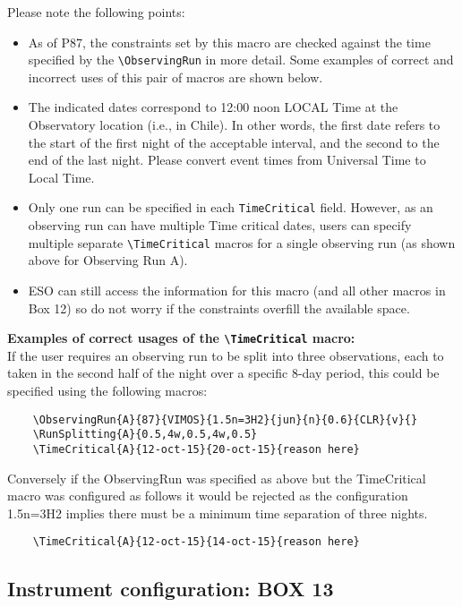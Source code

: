 \documentclass{article}
\begin{document}
Please note the following points:
\begin{itemize}
\item As of P87, the constraints set by this macro are checked against the
time specified by the \verb|\ObservingRun| in more detail.
Some examples of correct and incorrect uses of this pair of macros are shown below.
\item The indicated dates correspond to 12:00 noon LOCAL Time at
the Observatory location (i.e., in Chile). In other words, the first
date refers to the start of the first night of the acceptable
interval, and the second to the end of the last night. Please 
convert event times from Universal Time to Local Time.
\item Only one run can be specified in each \verb|TimeCritical| field. 
However, as an observing run can have multiple Time critical dates, users
can specify multiple separate \verb|\TimeCritical| macros for a single observing run (as shown above
for Observing Run A).
\item ESO can still access the information for this macro (and all other macros in Box 12) so
do not worry if the constraints overfill the available space.
\end{itemize}

{\bf Examples of correct usages of the \verb|\TimeCritical| macro: }\\
If the user requires an observing run to be split into three observations, each to taken in the 
second half of the night over a specific 8-day period, this could be specified using the following macros:
\begin{verbatim}
    \ObservingRun{A}{87}{VIMOS}{1.5n=3H2}{jun}{n}{0.6}{CLR}{v}{}
    \RunSplitting{A}{0.5,4w,0.5,4w,0.5}
    \TimeCritical{A}{12-oct-15}{20-oct-15}{reason here}
\end{verbatim}

Conversely if the ObservingRun was specified as above but the TimeCritical macro was configured as follows
it would be rejected as the configuration 1.5n=3H2 implies there must be a minimum time separation of
three nights.
\begin{verbatim}
    \TimeCritical{A}{12-oct-15}{14-oct-15}{reason here}
\end{verbatim}








\subsection{Instrument configuration: {\bf BOX 13}}
\end{document}
